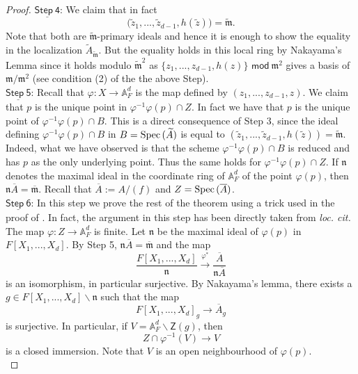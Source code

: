 \documentclass[10pt]{amsart}
\theoremstyle{plain}
\theoremstyle{definition}
\newcommand{\intersection}{\cap}
\newcommand{\Spec}{{\rm Spec \,}}
\renewcommand{\tilde}{\widetilde}
\newcommand{\A}{{\mathbb A}}
\let\syn\mathsf
\newcommand{\Step}[1]{\underline{\syn{Step \ {#1}}}}
\newcommand{\scr}{\scriptscriptstyle}
\begin{document}
\begin{proof}
\noindent $\Step{4}$:  We claim that in fact  $$\big(\tilde{z}_{\scr 1},...,\tilde{z}_{\scr d-1},h(\tilde{z})\big) = \tilde{\mathfrak{m}}.$$
Note that both are $\tilde{\mathfrak{m}}$-primary ideals and hence it is enough to show the equality in the localization $\tilde{A}_{\tilde{\mathfrak{m}}}.$ But the equality holds in this local ring by Nakayama's Lemma since it holds modulo $\tilde{\mathfrak{m}}^2$  as $\{ z_{\scr 1},...,z_{\scr d-1},h(z)\}$ $\syn{mod} \ \mathfrak{m}^2$ gives a basis of $\mathfrak{m}/\mathfrak{m}^2$ (see condition (2) of the the above Step).  \\

\noindent $\Step{5}$: Recall that  $\varphi: X\to \A^d_F$ is the map defined by $(z_{\scr 1},...,z_{\scr d-1},z)$. We claim that $p$ is the unique point in $\varphi^{-1}\varphi(p)\intersection Z$. In fact we have that $p$ is the unique point of $\varphi^{-1}\varphi(p)\intersection B$. This  is a direct consequence of Step 3, since  the ideal defining $\varphi^{-1}\varphi(p)\intersection B$ in $B=\Spec(\tilde{A})$ is equal to $(\tilde{z}_{\scr 1},...,\tilde{z}_{\scr d-1},h(\tilde{z}))=\tilde{\mathfrak m}$.  Indeed, what we have observed is that the scheme $\varphi^{-1}\varphi(p)\intersection B$ is reduced and has $p$ as the only underlying point. Thus the same holds for $\varphi^{-1}\varphi(p)\intersection Z$. If $\mathfrak{n}$ denotes the maximal ideal in the coordinate ring of $\A^d_F$ of the point $\varphi(p)$, then $\mathfrak{n}\overline{A} = \overline{\mathfrak{m}}$.  Recall that $\overline{A}:=A/(f)$ and $Z=\Spec(\overline{A})$. \\


\noindent $\Step{6}$: In this step we prove the rest of the theorem using a trick used in the proof of \cite[3.5.1]{chk}.
In fact, the argument in this step has been directly taken from {\it loc. cit.}  The map $\varphi:Z\to \A^d_F$ is finite. Let  $\mathfrak{n}$ be the maximal ideal of $\varphi(p)$ in $F[X_1,...,X_d]$.  By Step 5, $\mathfrak{n}\overline{A}=\overline{\mathfrak{m}}$ and the map 
$$ \frac{F[X_1,...,X_d]}{\mathfrak{n}} \xrightarrow{\varphi^*} \frac{\overline{A}}{\mathfrak{n}{\overline{A}}} $$ is an isomorphism, in particular surjective. By Nakayama's lemma, there exists a $g\in F[X_1,...,X_d]\backslash \mathfrak{n}$ such that the map 
$$ F[X_1,...,X_d]_g \to \overline{A}_g $$ is surjective. In particular, if $V=\A^d_F\backslash \syn{Z}(g)$, then 
$$Z \intersection \varphi^{-1}(V)  \to V$$ is a closed immersion. Note that $V$ is an open neighbourhood of $\varphi(p)$. \\


\end{proof}
\end{document}
